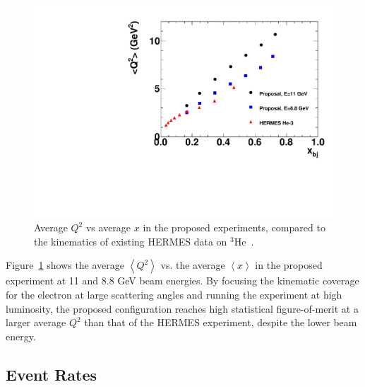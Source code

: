 \begin{figure}[h]
  \begin{center}
    \includegraphics[width=.75\textwidth]{figures/Q2_HERMES_compare.pdf}
  \end{center}
  \caption{\label{fig:Q2vsxHERMEScompare} Average $Q^2$ vs average $x$ in the proposed experiments, compared to the kinematics of existing HERMES data on $^3$He~\cite{Ackerstaff:1999ey}.}
\end{figure}
Figure~\ref{fig:Q2vsxHERMEScompare} shows the average $\left<Q^2\right>$ vs. the average $\left<x\right>$ in the proposed experiment at 11 and 8.8 GeV beam energies. By focusing the kinematic coverage for the electron at large scattering angles and running the experiment at high luminosity, the proposed configuration reaches high statistical figure-of-merit at a larger average $Q^2$ than that of the HERMES experiment, despite the lower beam energy. 

\subsection{Event Rates}

